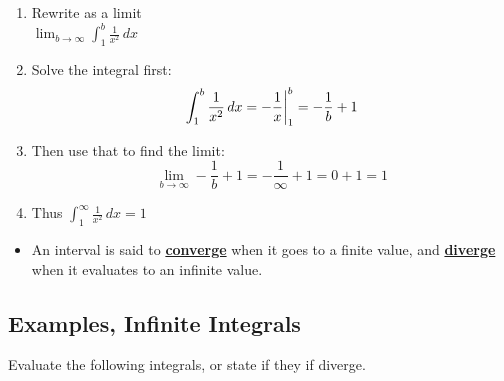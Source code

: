 \documentclass[12pt]{article}
\newcommand{\definition}[1]{\underline{\textbf{#1}}}
\begin{document}
\begin{enumerate}

    \item Rewrite as a limit \\ $\lim_{b\to\infty} \int_{1}^{b} \frac{1}{x^2} \,dx$

    \item Solve the integral first: \\
    \begin{equation*}
        \int_{1}^{b} \frac{1}{x^2} \,dx \\ 
        = -\frac{1}{x} \bigg\rvert_{1}^{b} \\
        = -\frac{1}{b} + 1 
    \end{equation*}

    \item Then use that to find the limit: \\
    \begin{equation*}
        \lim_{b\to\infty} -\frac{1}{b} + 1 = -\frac{1}{\infty} + 1 = 0 + 1 = 1
    \end{equation*}

    \item Thus $ \int_{1}^{\infty} \frac{1}{x^2} \,dx = 1 $

\end{enumerate}

\begin{itemize}
    \item An interval is said to \definition{converge} when it goes to a finite value, and \definition{diverge} when it evaluates to an infinite value.
\end{itemize}


\subsection*{Examples, Infinite Integrals}

Evaluate the following integrals, or state if they if diverge.
\end{document}
